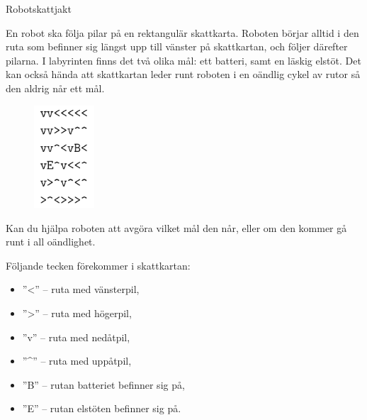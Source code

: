 \documentclass[10pt]{beamer}
\begin{document}
\begin{frame}{Robotskattjakt}

En robot ska följa pilar på en rektangulär skattkarta. Roboten börjar alltid i den ruta som befinner sig längst upp till vänster på skattkartan, och följer därefter pilarna. I labyrinten finns det två olika mål: ett batteri, samt en läskig elstöt. Det kan också hända att skattkartan leder runt roboten i en oändlig cykel av rutor så den aldrig når ett mål.


\begin{figure}
    \includegraphics[width=0.2\textwidth]{karta}
\end{figure}

Kan du hjälpa roboten att avgöra vilket mål den når, eller om den kommer gå runt i all oändlighet.


Följande tecken förekommer i skattkartan:
\begin{itemize}
\item ''<'' – ruta med vänsterpil,
\item ''>'' – ruta med högerpil,
\item ''v'' – ruta med nedåtpil,
\item ''\^{}'' – ruta med uppåtpil,
\item ''B'' – rutan batteriet befinner sig på,
\item ''E'' – rutan elstöten befinner sig på.
\end{itemize}

\end{frame}
\end{document}
